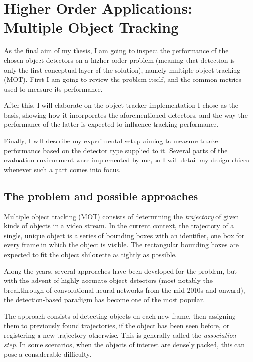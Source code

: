 \chapter{Higher Order Applications: Multiple Object Tracking}

As the final aim of my thesis, I am going to inspect the performance of the chosen object detectors on a higher-order problem (meaning that detection is only the first conceptual layer of the solution), namely multiple object tracking (MOT). First I am going to review the problem itself, and the common metrics used to measure its performance. 

After this, I will elaborate on the object tracker implementation I chose as the basis, showing how it incorporates the aforementioned detectors, and the way the performance of the latter is expected to influence tracking performance.

Finally, I will describe my experimental setup aiming to measure tracker performance based on the detector type supplied to it. Several parts of the evaluation environment were implemented by me, so I will detail my design chices whenever such a part comes into focus.

\section{The problem and possible approaches}

Multiple object tracking (MOT) consists of determining the \textit{trajectory} of given kinds of objects in a video stream. In the current context, the trajectory of a single, unique object is a series of bounding boxes with an identifier, one box for every frame in which the object is visible. The rectangular bounding boxes are expected to fit the object shilouette as tightly as possible.

Along the years, several approaches have been developed for the problem, but with the advent of highly accurate object detectors (most notably the breakthrough of convolutional neural networks from the mid-2010s and onward), the detection-based paradigm has become one of the most popular.

The approach consists of detecting objects on each new frame, then assigning them to previously found trajectories, if the object has been seen before, or registering a new trajectory otherwise. This is generally called the \textit{association step}. In some scenarios, when the objects of interest are densely packed, this can pose a considerable difficulty.

